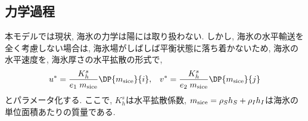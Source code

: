 \subsection{力学過程}
本モデルでは現状, 海氷の力学は陽には取り扱わない. 
しかし, 海氷の水平輸送を全く考慮しない場合は, 海氷場がしばしば平衡状態に落ち着かないため, 
海氷の水平速度を, 海氷厚さの水平拡散の形式で, 
\begin{equation}
 u^* = \dfrac{K_h^s}{e_1 \; m_{\rm sice}} \DP{m_{\rm sice}}{i}, \;\;\; 
 v^* = \dfrac{K_h^s}{e_2 \; m_{\rm sice}} \DP{m_{\rm sice}}{j}
\label{eq:sice_model_horivel_param_thickness_diff}
\end{equation}
とパラメータ化する. 
ここで, $K_h^s$は水平拡散係数, 
$m_{\rm sice}=\rho_S h_S + \rho_I h_I$は海氷の単位面積あたりの質量である. 
